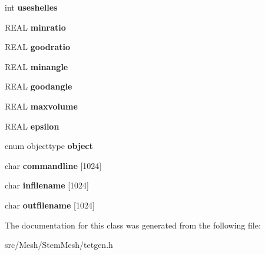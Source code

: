 \begin{DoxyCompactItemize}
int {\bfseries useshelles}
\item 
\mbox{\label{classStemMesh3D_1_1tetgenbehavior_ad044474129adf4e11693788896d32b98}} 
R\+E\+AL {\bfseries minratio}
\item 
\mbox{\label{classStemMesh3D_1_1tetgenbehavior_ac473bbdf122388ed03394a0ca8cf3e16}} 
R\+E\+AL {\bfseries goodratio}
\item 
\mbox{\label{classStemMesh3D_1_1tetgenbehavior_a59cd8376caa42912489a80d21be96a84}} 
R\+E\+AL {\bfseries minangle}
\item 
\mbox{\label{classStemMesh3D_1_1tetgenbehavior_a797b8ae299a36fe2793c518b9db24a9b}} 
R\+E\+AL {\bfseries goodangle}
\item 
\mbox{\label{classStemMesh3D_1_1tetgenbehavior_a8b9158c99c59da4418faf26e4ab704d4}} 
R\+E\+AL {\bfseries maxvolume}
\item 
\mbox{\label{classStemMesh3D_1_1tetgenbehavior_aba89c79b6f8c5acbf35945c5a979d5b1}} 
R\+E\+AL {\bfseries epsilon}
\item 
\mbox{\label{classStemMesh3D_1_1tetgenbehavior_a85d86a05edcdf148013eb1ccfd23901a}} 
enum objecttype {\bfseries object}
\item 
\mbox{\label{classStemMesh3D_1_1tetgenbehavior_abe857ac04d3b9f3a1b7c4be89117273f}} 
char {\bfseries commandline} \mbox{[}1024\mbox{]}
\item 
\mbox{\label{classStemMesh3D_1_1tetgenbehavior_af296c70a7c15d56ae8807ba63ef5bcca}} 
char {\bfseries infilename} \mbox{[}1024\mbox{]}
\item 
\mbox{\label{classStemMesh3D_1_1tetgenbehavior_a11b04b8d709b49f33a4e62368c0bd319}} 
char {\bfseries outfilename} \mbox{[}1024\mbox{]}
\end{DoxyCompactItemize}


The documentation for this class was generated from the following file\+:\begin{DoxyCompactItemize}
\item 
src/\+Mesh/\+Stem\+Mesh/tetgen.\+h\end{DoxyCompactItemize}
